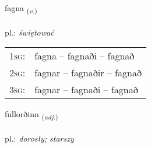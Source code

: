 \documentclass[frontgrid, backgrid]{flacards}\usepackage[]{graphicx}\usepackage[]{xcolor}
\begin{document}
\renewcommand{\flhead}{\vskip5pt \fboxsep=0pt {\small\bfseries\footnotesize Sagnorð | Verb}}
\renewcommand{\fcfoot}{\vskip5pt \fboxsep=0pt \hspace{2pt}{\small\bfseries\footnotesize 2K}}

\renewcommand{\blhead}{\vskip5pt {\small\bfseries\footnotesize Sagnorð | Verb }}
\renewcommand{\bcfoot}{\vskip5pt \hspace{2pt}{\small\bfseries\footnotesize 2K}}


{fagna \small{\textsubscript{(\textit{v.})}} \\[1ex] %
\textphonetic{[fakna]} \\
pl.: \emph{świętować} \\  [2ex]
\renewcommand*{\arraystretch}{0.8}
\begin{tabular}{p{1cm}l}
\textsc{1sg}: & fagna -- fagnaði -- fagnað \\ 
\textsc{2sg}: & fagnar -- fagnaðir -- fagnað \\ 
\textsc{3sg}: & fagnar -- fagnaði -- fagnað \\ 
\end{tabular}
}

\renewcommand{\flhead}{\vskip5pt \fboxsep=0pt {\small\bfseries\footnotesize Lýsingarorð | Adjective}}
\renewcommand{\fcfoot}{\vskip5pt \fboxsep=0pt \hspace{2pt}{\small\bfseries\footnotesize 2K}}

\renewcommand{\blhead}{\vskip5pt {\small\bfseries\footnotesize Lýsingarorð | Adjective }}
\renewcommand{\bcfoot}{\vskip5pt \hspace{2pt}{\small\bfseries\footnotesize 2K}}


{fullorðinn \small{\textsubscript{(\textit{adj.})}} \\[1ex] %
\textphonetic{[fʏtlɔrðɪn]} \\
pl.: \emph{dorosły; starszy} \\  [2ex]
\renewcommand*{\arraystretch}{0.8}
}
\end{document}
